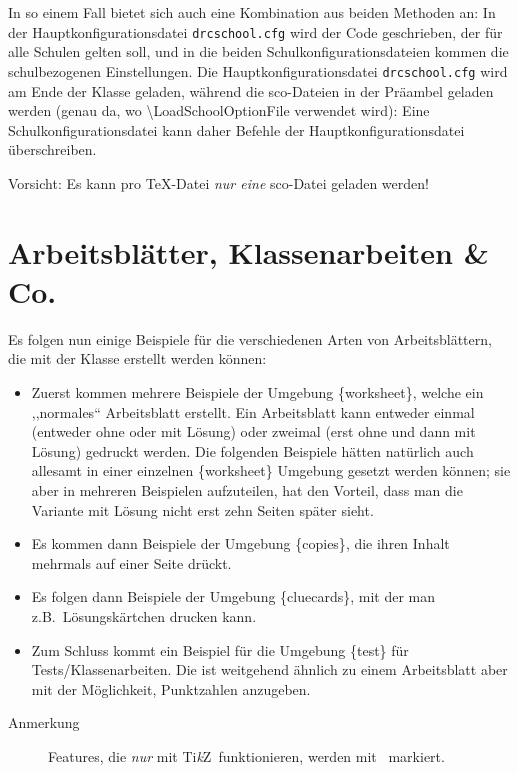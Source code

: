 \documentclass[hyperworksheet,pgfplots]{drcschool}
\makeatletter
\newcommand*{\cs}[1]{\textup{\ttfamily\textbackslash#1}}                   %
\newcommand*{\opt}[1]{\textup{\ttfamily#1}}                                %
\newcommand*{\env}[1]{\textup{\ttfamily\{#1\}}}                            %
\newcommand*{\TikZ}{\textup{Ti\textit{k}Z}}                                %
\newcommand*{\onlytikz}{%
   \textcolor{red}{%
      \vtop{%
         \vbox{%
            \vss                                                           %
            \hrule height\p@                                               %
            \kern2\p@                                                      %
            \hbox{\normalfont\normalsize! \TikZ\ !}%
         }%
         \kern2\p@                                                         %
         \hrule height\p@                                                  %
      }%
   }%
}                                                                          %
\makeatother
\begin{document}
In so einem Fall bietet sich auch eine Kombination aus beiden Methoden an:
In der Hauptkonfigurationsdatei \texttt{drcschool.cfg} wird der Code geschrieben,
der für
alle Schulen gelten soll, und in die beiden Schulkonfigurationsdateien
kommen die schulbezogenen
Einstellungen.
Die Hauptkonfigurationsdatei \texttt{drcschool.cfg}
wird am Ende der Klasse geladen, während die \opt{sco}-Dateien
in der Präambel geladen werden (genau da, wo \cs{LoadSchoolOptionFile} verwendet wird):
Eine Schulkonfigurationsdatei kann daher Befehle der Hauptkonfigurationsdatei
überschreiben.

Vorsicht: Es kann pro \TeX-Datei \emph{nur eine} \opt{sco}-Datei geladen werden!


\section{Arbeitsblätter, Klassenarbeiten \& Co.}
Es folgen nun einige Beispiele für die verschiedenen Arten von Arbeitsblättern, die mit
der Klasse erstellt werden können:
\begin{itemize}
\item Zuerst kommen mehrere Beispiele der Umgebung \env{worksheet}, welche ein ,,normales``
      Arbeitsblatt erstellt. Ein Arbeitsblatt kann entweder einmal (entweder ohne oder mit Lösung)
      oder zweimal (erst ohne und dann mit Lösung) gedruckt werden. Die folgenden Beispiele
      hätten natürlich auch allesamt in einer einzelnen \env{worksheet} Umgebung gesetzt
      werden können; sie aber in mehreren Beispielen aufzuteilen, hat den Vorteil, dass
      man die Variante mit Lösung nicht erst zehn Seiten später sieht.
\item Es kommen dann Beispiele der Umgebung \env{copies}, die ihren Inhalt mehrmals auf einer
      Seite drückt.
\item Es folgen dann Beispiele der Umgebung \env{cluecards}, mit der man z.B.~Lösungskärtchen drucken kann.
\item Zum Schluss kommt ein Beispiel für die Umgebung \env{test} für Tests/Klassenarbeiten.
      Die ist weitgehend ähnlich zu einem Arbeitsblatt aber mit der Möglichkeit,
      Punktzahlen anzugeben.
\end{itemize}

\begin{description}
\item[Anmerkung] Features, die \emph{nur} mit \TikZ\ funktionieren, werden mit
\onlytikz\ markiert.
\end{description}
\end{document}
